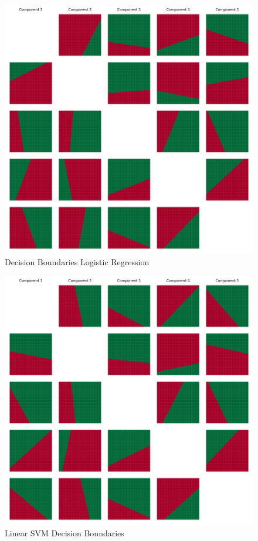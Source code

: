 \documentclass{article}
\begin{document}
\begin{figure}[htb]
    \centering
    \includegraphics[width = 1.0\linewidth]{log_regression_classification.png}
    \caption{Decision Boundaries Logistic Regression}
\end{figure}

\begin{figure}[htb]
    \centering
    \includegraphics[width = 1.0\linewidth]{linear_svm_classification.png}
    \caption{Linear SVM Decision Boundaries}
\end{figure}
\end{document}

